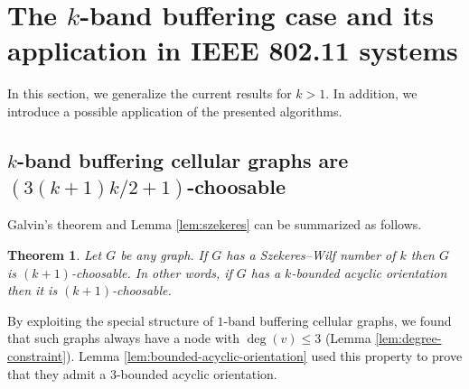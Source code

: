 \documentclass[a4paper, 12pt]{article}
\newtheorem{theo}[lem]{Theorem}
\begin{document}
\section{The $k$-band buffering case and its application in IEEE 802.11 systems}\label{sec:k-band-case}
In this section, we generalize the current results for $k > 1$. In addition, we introduce a possible application of the presented algorithms.

\subsection{$k$-band buffering cellular graphs are $(3(k+1)k/2+1)$-choosable}
Galvin's theorem and Lemma \ref{lem:szekeres} can be summarized as follows.
\begin{theo} Let $G$ be any graph. If $G$ has a Szekeres\---Wilf number of $k$ then $G$ is $(k+1)$-choosable. In other words, if $G$ has a $k$-bounded acyclic orientation then it is $(k+1)$-choosable.
\end{theo}

By exploiting the special structure of $1$-band buffering cellular graphs, we found that such graphs always have a node with $\deg(v) \leqslant 3$ (Lemma \ref{lem:degree-constraint}). Lemma \ref{lem:bounded-acyclic-orientation} used this property to prove that they admit a $3$-bounded acyclic orientation.
\end{document}
